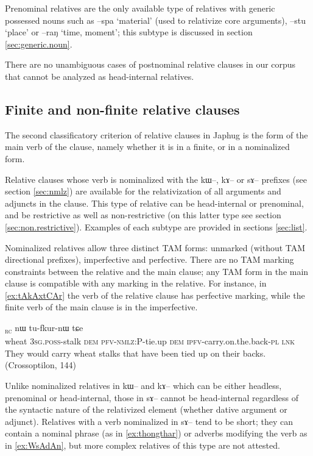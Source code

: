 \documentclass[oldfontcommands,oneside,a4paper,11pt]{article}
\newcommand{\ipa}[1]{{\phon #1}} %
\newcommand{\topic}{\textsc{dem}}
\newcommand{\tete}{\textsuperscript{\textsc{head}}}
\newcommand{\rc}{\textsubscript{\textsc{rc}}}
\begin{document}
  
Prenominal relatives are the only available type of relatives with generic possessed nouns such as \ipa{--spa} `material' (used to relativize core arguments), \ipa{--stu} `place' or \ipa{--raŋ} `time, moment'; this subtype is discussed in section \ref{sec:generic.noun}.

There are no unambiguous cases of postnominal relative clauses in our corpus that cannot be analyzed as head-internal relatives.

\subsection{Finite and non-finite relative clauses} \label{sec:nmlz.vs.n.nmlz}

The second classificatory criterion of relative clauses in Japhug is the form of the main verb of the clause, namely whether it is in a finite, or in a nominalized form.


Relative clauses whose verb is nominalized with the \ipa{kɯ}--, \ipa{kɤ}-- or \ipa{sɤ}-- prefixes (see section \ref{sec:nmlz}) are available for the relativization of all arguments and adjuncts in the clause. This type of relative can be head-internal or prenominal, and be restrictive as well as non-restrictive (on this latter type see section \ref{sec:non.restrictive}). Examples of each subtype are provided in sections \ref{sec:list}.

Nominalized relatives allow three distinct TAM forms: unmarked (without TAM directional prefixes), imperfective and perfective. There are no  TAM marking constraints between the relative and the main clause; any TAM form in the main clause is compatible with any marking in the relative. For instance, in \ref{ex:tAkAxtCAr} the verb of the relative clause has perfective marking, while the finite verb of the main clause is in the imperfective. 

 
\begin{exe}
\ex \label{ex:tAkAxtCAr}
\gll
	[\textbf{\ipa{qɤj}}  	\textbf{\ipa{ɯ-ru}}\tete{}  	\ipa{nɯnɯ}  	\ipa{tɤ-kɤ-xtɕɤr}]\rc{}  	\ipa{nɯ}  	\ipa{tu-fkur-nɯ}  	\ipa{tɕe}  \\
wheat	\textsc{3sg.poss}-stalk \topic{} \textsc{pfv-nmlz:P}-tie.up \topic{} \textsc{ipfv}-carry.on.the.back-\textsc{pl} \textsc{lnk} \\
	\glt They would carry  wheat stalks that have been tied up on their backs.	(Crossoptilon, 144)
	  \end{exe} 

 
Unlike nominalized relatives in \ipa{kɯ}-- and \ipa{kɤ}-- which can be either headless, prenominal or head-internal, those in \ipa{sɤ}-- cannot be head-internal regardless of the syntactic nature of the relativized element (whether dative argument or adjunct). Relatives with a verb nominalized in \ipa{sɤ}-- tend to be short; they can contain a nominal phrase (as in  \ref{ex:thongthar}) or adverbs modifying the verb as in \ref{ex:WsAdAn}, but more complex relatives of this type are not attested.
 
\end{document}
